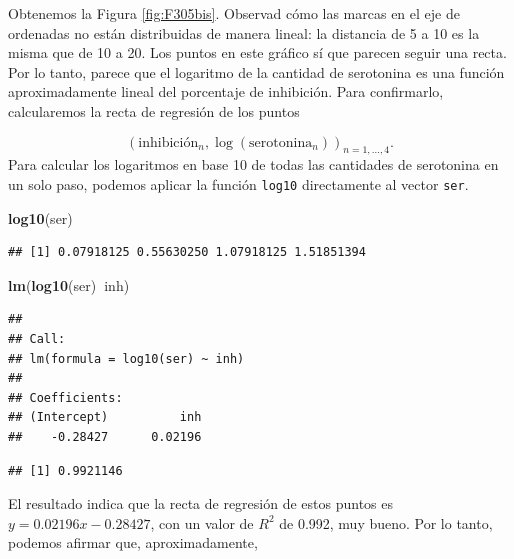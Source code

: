 \documentclass[]{book}
\newenvironment{Shaded}{\begin{snugshade}}{\end{snugshade}}
\newcommand{\KeywordTok}[1]{\textcolor[rgb]{0.13,0.29,0.53}{\textbf{#1}}}
\newcommand{\NormalTok}[1]{#1}
\newcommand{\OperatorTok}[1]{\textcolor[rgb]{0.81,0.36,0.00}{\textbf{#1}}}
\theoremstyle{definition}
\theoremstyle{definition}
\theoremstyle{definition}
\theoremstyle{remark}
\begin{document}
Obtenemos la Figura \ref{fig:F305bis}. Observad cómo las marcas en el eje de ordenadas no están distribuidas de manera lineal: la distancia de 5 a 10 es la misma que de 10 a 20. Los puntos en este gráfico sí que parecen seguir una recta. Por lo tanto, parece que el logaritmo de la cantidad de serotonina es una función aproximadamente lineal del porcentaje de inhibición.
Para confirmarlo, calcularemos la recta de regresión de los puntos

\[
(\textrm{inhibición}_n,\log(\textrm{serotonina}_n))_{n=1,\ldots,4}.
\]
Para calcular los logaritmos en base 10 de todas las cantidades de serotonina en un solo paso, podemos aplicar la función \texttt{log10} directamente al vector \texttt{ser}.

\begin{Shaded}
\begin{Highlighting}[]
\KeywordTok{log10}\NormalTok{(ser)}
\end{Highlighting}
\end{Shaded}

\begin{verbatim}
## [1] 0.07918125 0.55630250 1.07918125 1.51851394
\end{verbatim}

\begin{Shaded}
\begin{Highlighting}[]
\KeywordTok{lm}\NormalTok{(}\KeywordTok{log10}\NormalTok{(ser)}\OperatorTok{~}\NormalTok{inh)}
\end{Highlighting}
\end{Shaded}

\begin{verbatim}
## 
## Call:
## lm(formula = log10(ser) ~ inh)
## 
## Coefficients:
## (Intercept)          inh  
##    -0.28427      0.02196
\end{verbatim}

\begin{Shaded}
\end{Shaded}

\begin{verbatim}
## [1] 0.9921146
\end{verbatim}

El resultado indica que la recta de regresión de estos puntos es
\(y= 0.02196x-0.28427\), con un valor de \(R^2\) de 0.992, muy bueno.
Por lo tanto, podemos afirmar que, aproximadamente,
\end{document}
